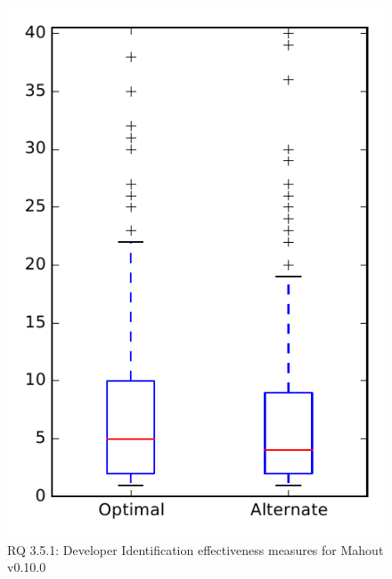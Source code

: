 
\begin{figure}
\centering
\includegraphics[height=0.4\textheight]{figures/combo/dit_rq1_mahout}
\caption{RQ 3.5.1: Developer Identification effectiveness measures for Mahout v0.10.0}
\label{fig:dit:rq1:mahout}
\end{figure}
